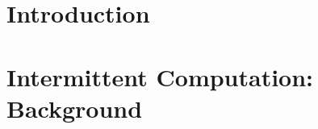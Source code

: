 \documentclass[pageno]{jpaper}
\newcommand{\TODO}[1]{{\bf \em \textcolor{red}{TODO: #1}\xspace}}
\begin{document}



\section{Introduction}
\label{sec:intro}




\section{Intermittent Computation: Background}
\label{sec:background}


\end{document}

